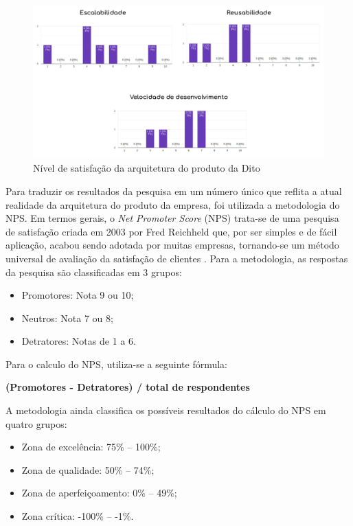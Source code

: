 \begin{figure}
  \begin{center}
	  \includegraphics[width=\linewidth]{./04-figuras/08_avaliacao_resultados/product-metrics.png}
	\end{center}
  \caption{Nível de satisfação da arquitetura do produto da Dito}
  \label{fig:productMetrics}
\end{figure}

Para traduzir os resultados da pesquisa em um número único que reflita a atual realidade da arquitetura do produto da empresa, foi utilizada a metodologia do NPS. Em termos gerais, o \textit{Net Promoter Score} (NPS) trata-se de uma pesquisa de satisfação criada em 2003 por Fred Reichheld que, por ser simples e de fácil aplicação, acabou sendo adotada por muitas empresas, tornando-se um método universal de avaliação da satisfação de clientes \cite{nps}. Para a metodologia, as respostas da pesquisa são classificadas em 3 grupos:

\begin{itemize}
  \item Promotores: Nota 9 ou 10;
  \item Neutros: Nota 7 ou 8;
  \item Detratores: Notas de 1 a 6.
\end{itemize}

Para o calculo do NPS, utiliza-se a seguinte fórmula:
\begin{center}
  \textbf{(Promotores - Detratores) / total de respondentes}    
\end{center}{}

A metodologia ainda classifica os possíveis resultados do cálculo do NPS em quatro grupos:

\begin{itemize}
  \item Zona de excelência: 75\% -- 100\%;
  \item Zona de qualidade: 50\% -- 74\%;
  \item Zona de aperfeiçoamento: 0\% -- 49\%;
  \item Zona crítica: -100\% -- -1\%.
\end{itemize}

